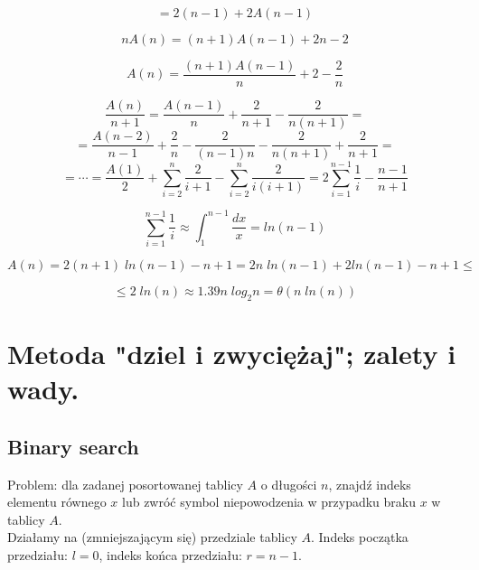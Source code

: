 \documentclass[12pt]{article}
\begin{document}
        $$= 2(n - 1) + 2A(n - 1)$$
        
        $$nA(n) = (n + 1)A(n - 1) + 2n - 2$$
        
        $$A(n) = \frac{(n + 1)A(n - 1)}{n} + 2 - \frac{2}{n}$$
        
        $$\frac{A(n)}{n + 1} = \frac{A(n - 1)}{n} + \frac{2}{n + 1} - \frac{2}{n(n + 1)} = $$
         $$= \frac{A(n - 2)}{n - 1} + \frac{2}{n} - \frac{2}{(n - 1)n} - \frac{2}{n(n + 1)} + \frac{2}{n + 1} = $$
         $$ = \cdots = \frac{A(1)}{2} + \sum_{i = 2}^n \frac{2}{i + 1} - \sum_{i = 2}^n \frac{2}{i(i + 1)} = 
         2\sum_{i = 1}^{n - 1} \frac{1}{i} - \frac{n - 1}{n + 1}$$
         
         $$\sum_{i = 1}^{n - 1} \frac{1}{i} \approx \int_1^{n - 1}\frac{dx}{x} = ln(n - 1)$$
         
         $$A(n) = 2(n + 1)\;ln(n - 1) - n + 1 = 2n\;ln(n - 1) + 2ln(n - 1) - n + 1 \leq$$
         
         $$\leq 2\;ln(n) \approx 1.39 n \; log_2 n = \theta(n\;ln(n))$$
        
    \newpage


    \section{Metoda "dziel i zwyciężaj"; zalety i wady.}
    
        \subsection{Binary search}

        Problem: dla zadanej posortowanej tablicy $A$ o długości $n$, znajdź indeks elementu
        równego $x$ lub zwróć symbol niepowodzenia w przypadku braku $x$ w tablicy $A$.
        \[\]
        Działamy na (zmniejszającym się) przedziale tablicy $A$. Indeks początka przedziału: 
        $l = 0$, indeks końca przedziału: $r = n - 1$.
\end{document}
